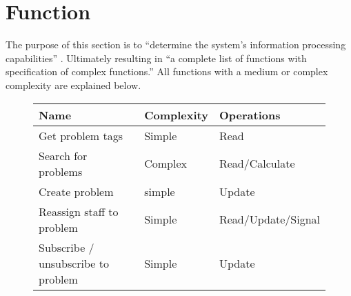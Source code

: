 \section{Function}
\label{sec:function}

The purpose of this section is to ``determine the system's information processing capabilities'' \cite[p.~137]{roedeaalborg}. Ultimately resulting in ``a complete list of functions with specification of complex functions.'' \cite[p.~137]{roedeaalborg} 
All functions with a medium or complex complexity are explained below.



\begin{figure}[hpt] %
\begin{center}
\begin{tabular}{|l|l|l|}
\hline
\textbf{Name}								&\textbf{Complexity} & \textbf{Operations}   \\ \hline%
Get problem tags						&   Simple & Read   \\ \hline%
Search for problems 				&  Complex & Read/Calculate   \\ \hline%
Create problem 							&   simple & Update   \\ \hline%
Reassign staff to problem 	&   Simple & Read/Update/Signal   \\ \hline%
Subscribe / unsubscribe  to problem 	&   Simple & Update   \\ \hline%

\end{tabular}
\end{center}
\end{figure}
